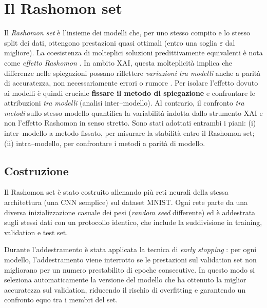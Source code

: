 \documentclass[12pt,a4paper,oneside]{report}
\numberwithin{figure}{chapter}
\numberwithin{table}{chapter}
\begin{document}
\chapter{Il Rashomon set}

Il \emph{Rashomon set} è l’insieme dei modelli che, per uno stesso compito e lo
stesso split dei dati, ottengono prestazioni quasi ottimali (entro una soglia
$\varepsilon$ dal migliore). La coesistenza di molteplici soluzioni
predittivamente equivalenti è nota come \emph{effetto Rashomon}
\citep{fisher2019all,mueller2023rashomon}. In ambito XAI, questa molteplicità
implica che differenze nelle spiegazioni possano riflettere \emph{variazioni
      tra modelli} anche a parità di accuratezza, non necessariamente errori o rumore
\citep{semenova2019existence}. Per isolare l’effetto dovuto ai modelli è quindi
cruciale \textbf{fissare il metodo di spiegazione} e confrontare le
attribuzioni \emph{tra modelli} (analisi inter–modello). Al contrario, il
confronto \emph{tra metodi} sullo stesso modello quantifica la variabilità
indotta dallo strumento XAI e non l’effetto Rashomon in senso stretto. Sono
stati adottati entrambi i piani: (i) inter–modello a metodo fissato, per
misurare la stabilità entro il Rashomon set; (ii) intra–modello, per
confrontare i metodi a parità di modello.

\section{Costruzione}
Il Rashomon set è stato costruito allenando più reti neurali della stessa
architettura (una CNN semplice) sul dataset MNIST. Ogni rete parte da una
diversa inizializzazione casuale dei pesi (\emph{random seed} differente) ed è
addestrata sugli stessi dati con un protocollo identico, che include la
suddivisione in training, validation e test set.

Durante l’addestramento è stata applicata la tecnica di \emph{early stopping}
\citep{prechelt1998early}: per ogni modello, l’addestramento viene interrotto
se le prestazioni sul validation set non migliorano per un numero prestabilito
di epoche consecutive. In questo modo si seleziona automaticamente la versione
del modello che ha ottenuto la miglior accuratezza sul validation, riducendo il
rischio di overfitting e garantendo un confronto equo tra i membri del set.
\end{document}
